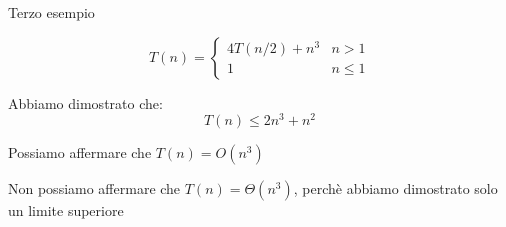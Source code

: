 \begin{frame}[noframenumbering,shrink=5]{Terzo esempio}

\vspace{-6pt}
\begin{mybox}
\[
T(n) = \begin{cases}
     4T(n/2) + n^3 & n > 1 \\
     1 & n \leq 1
  \end{cases} 
\]
\end{mybox}

Abbiamo dimostrato che:
\[
  T(n) \leq 2n^3 + n^2
\]

\bigskip
\BIL
\item Possiamo affermare che  $T(n) = O(n^3)$
\item Non possiamo affermare che $T(n) = \Theta(n^3)$, perchè  abbiamo
dimostrato solo un limite superiore
\EIL

\end{frame}

